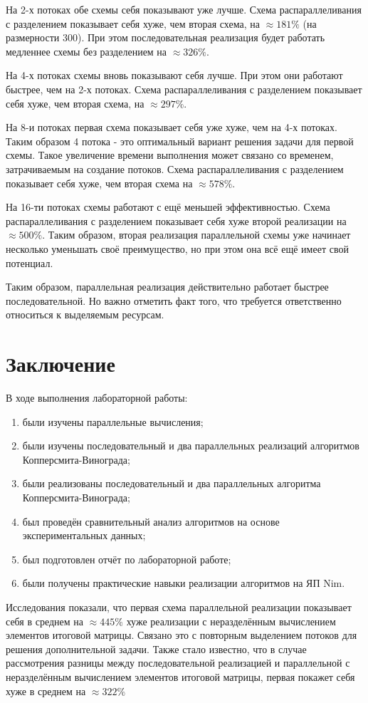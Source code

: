 \documentclass[12pt]{report}
\begin{document}
На 2-х потоках обе схемы себя показывают уже лучше. Схема распараллеливания с разделением показывает себя хуже, чем вторая схема, на $\approx 181\%$ (на размерности 300). При этом последовательная реализация будет работать медленнее схемы без разделением на $\approx 326\%$.

На 4-х потоках схемы вновь показывают себя лучше. При этом они работают быстрее, чем на 2-х потоках. Схема распараллеливания с разделением показывает себя хуже, чем вторая схема, на $\approx 297\%$.

На 8-и потоках первая схема показывает себя уже хуже, чем на 4-х потоках. Таким образом 4 потока - это оптимальный вариант решения задачи для первой схемы. Такое увеличение времени выполнения может связано со временем, затрачиваемым на создание потоков. Схема распараллеливания с разделением показывает себя хуже, чем вторая схема на $\approx 578\%$.

На 16-ти потоках схемы работают с ещё меньшей эффективностью. Схема распараллеливания с разделением показывает себя хуже второй реализации на $\approx 500\%$.  Таким образом, вторая реализация параллельной схемы уже начинает несколько уменьшать своё преимущество, но при этом она всё ещё имеет свой потенциал.

Таким образом, параллельная реализация действительно работает быстрее последовательной. Но важно отметить факт того, что требуется ответственно относиться к выделяемым ресурсам.

\chapter*{Заключение}
В ходе выполнения лабораторной работы:
\begin{enumerate}
\item были изучены параллельные вычисления;
\item были изучены последовательный и два параллельных реализаций алгоритмов Копперсмита-Винограда;
\item были реализованы последовательный и два параллельных алгоритма Копперсмита-Винограда;
\item был проведён сравнительный анализ алгоритмов на основе экспериментальных данных;
\item был подготовлен отчёт по лабораторной работе;
\item были получены практические навыки реализации алгоритмов на ЯП Nim.
\end{enumerate}

Исследования показали, что первая схема параллельной реализации показывает себя в среднем на $\approx 445\%$ хуже реализации с неразделённым вычислением элементов итоговой матрицы. Связано это с повторным выделением потоков для решения дополнительной задачи. Также стало известно, что в случае рассмотрения разницы между последовательной реализацией и параллельной с неразделённым вычислением элементов итоговой матрицы, первая покажет себя хуже в среднем на $\approx 322\%$

\end{document}
